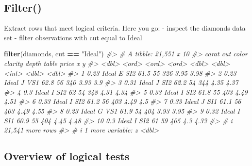 \documentclass[
]{book}
\newenvironment{Shaded}{\begin{snugshade}}{\end{snugshade}}
\newcommand{\CommentTok}[1]{\textcolor[rgb]{0.56,0.35,0.01}{\textit{#1}}}
\newcommand{\FunctionTok}[1]{\textcolor[rgb]{0.13,0.29,0.53}{\textbf{#1}}}
\newcommand{\NormalTok}[1]{#1}
\newcommand{\SpecialCharTok}[1]{\textcolor[rgb]{0.81,0.36,0.00}{\textbf{#1}}}
\newcommand{\StringTok}[1]{\textcolor[rgb]{0.31,0.60,0.02}{#1}}
\begin{document}
\subsection*{Filter()}\label{filter}

Extract rows that meet logical criteria. Here you go: - inspect the
diamonds data set - filter observations with cut equal to Ideal

\begin{Shaded}
\begin{Highlighting}[]
\FunctionTok{filter}\NormalTok{(diamonds, cut }\SpecialCharTok{==} \StringTok{"Ideal"}\NormalTok{)}
\CommentTok{\#\textgreater{} \# A tibble: 21,551 x 10}
\CommentTok{\#\textgreater{}    carat cut   color clarity depth table price     x     y}
\CommentTok{\#\textgreater{}    \textless{}dbl\textgreater{} \textless{}ord\textgreater{} \textless{}ord\textgreater{} \textless{}ord\textgreater{}   \textless{}dbl\textgreater{} \textless{}dbl\textgreater{} \textless{}int\textgreater{} \textless{}dbl\textgreater{} \textless{}dbl\textgreater{}}
\CommentTok{\#\textgreater{}  1  0.23 Ideal E     SI2      61.5    55   326  3.95  3.98}
\CommentTok{\#\textgreater{}  2  0.23 Ideal J     VS1      62.8    56   340  3.93  3.9 }
\CommentTok{\#\textgreater{}  3  0.31 Ideal J     SI2      62.2    54   344  4.35  4.37}
\CommentTok{\#\textgreater{}  4  0.3  Ideal I     SI2      62      54   348  4.31  4.34}
\CommentTok{\#\textgreater{}  5  0.33 Ideal I     SI2      61.8    55   403  4.49  4.51}
\CommentTok{\#\textgreater{}  6  0.33 Ideal I     SI2      61.2    56   403  4.49  4.5 }
\CommentTok{\#\textgreater{}  7  0.33 Ideal J     SI1      61.1    56   403  4.49  4.55}
\CommentTok{\#\textgreater{}  8  0.23 Ideal G     VS1      61.9    54   404  3.93  3.95}
\CommentTok{\#\textgreater{}  9  0.32 Ideal I     SI1      60.9    55   404  4.45  4.48}
\CommentTok{\#\textgreater{} 10  0.3  Ideal I     SI2      61      59   405  4.3   4.33}
\CommentTok{\#\textgreater{} \# i 21,541 more rows}
\CommentTok{\#\textgreater{} \# i 1 more variable: z \textless{}dbl\textgreater{}}
\end{Highlighting}
\end{Shaded}

\subsection*{Overview of logical tests}\label{overview-of-logical-tests}
\end{document}
